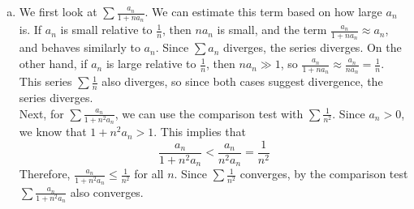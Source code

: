 \documentclass[11pt]{article}
\begin{document}
\begin{exercise}{11}
\begin{enumerate} [(a)]
\begin{proof}
\[
\frac{1}{s_{n-1}} - \frac{1}{s_n} = \frac{s_n - s_{n-1}}{s_{n-1} s_n} = \frac{a_n}{s_{n-1} s_n}.
\] Since \( s_{n-1} < s_n \), it follows that:
\[
s_{n-1} s_n < s_n s_n = s_n^2.
\]
Therefore, 
\[
\frac{a_n}{s_{n-1} s_n} > \frac{a_n}{s_n^2}.
\]
which implies 
\[
\frac{1}{s_{n-1}} - \frac{1}{s_n} = \frac{a_n}{s_{n-1} s_n} > \frac{a_n}{s_n^2}.
\]
Thus:
\[
\frac{a_n}{s_n^2} \leq \frac{1}{s_{n-1}} - \frac{1}{s_n}.
\]
Then, we consider the partial sums up to \( N \):
\[
\sum_{n=1}^N \frac{a_n}{s_n^2} \leq \sum_{n=1}^N \left( \frac{1}{s_{n-1}} - \frac{1}{s_n} \right).
\]
We see that the right-hand side is a telescoping sum:
\[
\sum_{n=1}^N \left( \frac{1}{s_{n-1}} - \frac{1}{s_n} \right) = \frac{1}{s_0} - \frac{1}{s_N}.
\]
Since \( s_0 = 0 \), \( \frac{1}{s_0} \) is undefined, so we start the sum from \( n = 2 \). For \( n \geq 2 \):
\[
\sum_{n=2}^N \frac{a_n}{s_n^2} \leq \frac{1}{s_1} - \frac{1}{s_N}.
\]
As \( N \to \infty \), \( s_N \to \infty \), so \( \frac{1}{s_N} \to 0 \).

Therefore:
\[
\sum_{n=2}^\infty \frac{a_n}{s_n^2} \leq \frac{1}{s_1}.
\]

Adding \( \dfrac{a_1}{s_1^2} \) to both sides:
\[
\sum_{n=1}^\infty \frac{a_n}{s_n^2} = \frac{a_1}{s_1^2} + \sum_{n=2}^\infty \frac{a_n}{s_n^2} \leq \frac{a_1}{s_1^2} + \frac{1}{s_1}.
\]
Since \( \dfrac{a_1}{s_1^2} \) and \( \dfrac{1}{s_1} \) are finite constants, the entire sum is bounded above by a finite number. Because the partial sums of \( \sum\limits_{n=1}^\infty \dfrac{a_n}{s_n^2} \) are bounded above and increase monotonically (since all terms are positive), the series converges.
        \end{proof}
        \item \begin{solution}
            We first look at $\sum \frac{a_n}{1 + na_n}$. We can estimate this term based on how large $a_n$ is. If $a_n$ is small relative to $\frac{1}{n}$, then $na_n$ is small, and the term $\frac{a_n}{1 + na_n} \approx a_n$, and behaves similarly to $a_n$. Since $\sum a_n$ diverges, the series diverges. On the other hand, if $a_n$ is large relative to $\frac{1}{n}$, then $na_n \gg 1$, so $\frac{a_n}{1+na_n} \approx \frac{a_n}{na_n} = \frac{1}{n}$. This series $\sum \frac{1}{n}$ also diverges, so since both cases suggest divergence, the series diverges. \\

            Next, for $\sum \frac{a_n}{1 + n^2a_n}$, we can use the comparison test with $\sum \frac{1}{n^2}$. Since $a_n > 0$, we know that $1 + n^2a_n > 1$. This implies that $$\frac{a_n}{1 + n^2a_n} < \frac{a_n}{n^2a_n} = \frac{1}{n^2}$$ Therefore, $\frac{a_n}{1+n^2a_n} \le \frac{1}{n^2}$ for all $n$. Since $\sum \frac{1}{n^2}$ converges, by the comparison test $\sum \frac{a_n}{1+n^2a_n}$ also converges. 
        \end{solution}
    \end{enumerate}
\end{exercise}
\end{document}
